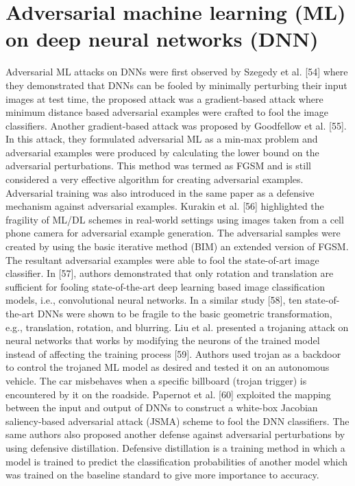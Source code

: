 \section{Adversarial machine learning (ML) on deep neural networks (DNN)}
    Adversarial ML attacks on DNNs were first observed by Szegedy et al. [54] where they demonstrated that DNNs can be fooled by minimally perturbing their input images at test time, the proposed attack was a gradient-based attack where minimum distance based adversarial examples were crafted to fool the image classifiers. 
    \newline
    Another gradient-based attack was proposed by Goodfellow et al. [55]. In this attack, they formulated adversarial ML as a min-max problem and adversarial examples were produced by calculating the lower bound on the adversarial perturbations. This method was termed as FGSM and is still considered a very effective algorithm for creating adversarial examples. Adversarial training was also introduced in the same paper as a defensive mechanism against adversarial examples.
    \newline
    Kurakin et al. [56] highlighted the fragility of ML/DL schemes in real-world settings using images taken from a cell phone camera for adversarial example generation. The adversarial samples were created by using the basic iterative method (BIM) an extended version of FGSM. The resultant adversarial examples were able to fool the state-of-art image classifier.
    \newline
    In [57], authors demonstrated that only rotation and translation are sufficient for fooling state-of-the-art deep learning based image classification models, i.e., convolutional neural networks. 
    \newline
    In a similar study [58], ten state-of-the-art DNNs were shown to be fragile to the basic geometric transformation, e.g., translation, rotation, and blurring. Liu et al. presented a trojaning attack on neural networks that works by modifying the neurons of the trained model instead of affecting the training process [59]. Authors used trojan as a backdoor to control the trojaned ML model as desired and tested it on an autonomous vehicle. The car misbehaves when a specific billboard (trojan trigger) is encountered by it on the roadside. 
    \newline
    Papernot et al. [60] exploited the mapping between the input and output of DNNs to construct a white-box Jacobian saliency-based adversarial attack (JSMA) scheme to fool the DNN classifiers. The same authors also proposed another defense against adversarial perturbations by using defensive distillation. Defensive distillation is a training method in which a model is trained to predict the classification probabilities of another model which was trained on the baseline standard to give more importance to accuracy. 

